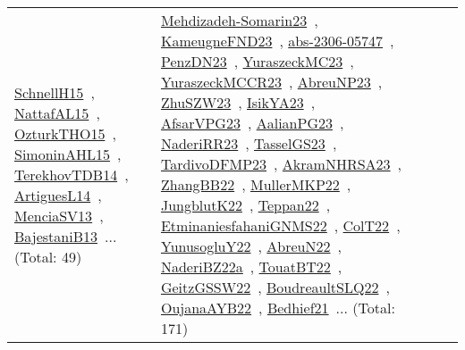 {\begin{longtable}{lp{3cm}>{\raggedright\arraybackslash}p{6cm}>{\raggedright\arraybackslash}p{6cm}>{\raggedright\arraybackslash}p{8cm}}
\href{../works/SchnellH15.pdf}{SchnellH15}~\cite{SchnellH15}, \href{../works/NattafAL15.pdf}{NattafAL15}~\cite{NattafAL15}, \href{../works/OzturkTHO15.pdf}{OzturkTHO15}~\cite{OzturkTHO15}, \href{../works/SimoninAHL15.pdf}{SimoninAHL15}~\cite{SimoninAHL15}, \href{../works/TerekhovTDB14.pdf}{TerekhovTDB14}~\cite{TerekhovTDB14}, \href{../works/ArtiguesL14.pdf}{ArtiguesL14}~\cite{ArtiguesL14}, \href{../works/MenciaSV13.pdf}{MenciaSV13}~\cite{MenciaSV13}, \href{../works/BajestaniB13.pdf}{BajestaniB13}~\cite{BajestaniB13}... (Total: 49) & \href{../works/Mehdizadeh-Somarin23.pdf}{Mehdizadeh-Somarin23}~\cite{Mehdizadeh-Somarin23}, \href{../works/KameugneFND23.pdf}{KameugneFND23}~\cite{KameugneFND23}, \href{../works/abs-2306-05747.pdf}{abs-2306-05747}~\cite{abs-2306-05747}, \href{../works/PenzDN23.pdf}{PenzDN23}~\cite{PenzDN23}, \href{../works/YuraszeckMC23.pdf}{YuraszeckMC23}~\cite{YuraszeckMC23}, \href{../works/YuraszeckMCCR23.pdf}{YuraszeckMCCR23}~\cite{YuraszeckMCCR23}, \href{../works/AbreuNP23.pdf}{AbreuNP23}~\cite{AbreuNP23}, \href{../works/ZhuSZW23.pdf}{ZhuSZW23}~\cite{ZhuSZW23}, \href{../works/IsikYA23.pdf}{IsikYA23}~\cite{IsikYA23}, \href{../works/AfsarVPG23.pdf}{AfsarVPG23}~\cite{AfsarVPG23}, \href{../works/AalianPG23.pdf}{AalianPG23}~\cite{AalianPG23}, \href{../works/NaderiRR23.pdf}{NaderiRR23}~\cite{NaderiRR23}, \href{../works/TasselGS23.pdf}{TasselGS23}~\cite{TasselGS23}, \href{../works/TardivoDFMP23.pdf}{TardivoDFMP23}~\cite{TardivoDFMP23}, \href{../works/AkramNHRSA23.pdf}{AkramNHRSA23}~\cite{AkramNHRSA23}, \href{../works/ZhangBB22.pdf}{ZhangBB22}~\cite{ZhangBB22}, \href{../works/MullerMKP22.pdf}{MullerMKP22}~\cite{MullerMKP22}, \href{../works/JungblutK22.pdf}{JungblutK22}~\cite{JungblutK22}, \href{../works/Teppan22.pdf}{Teppan22}~\cite{Teppan22}, \href{../works/EtminaniesfahaniGNMS22.pdf}{EtminaniesfahaniGNMS22}~\cite{EtminaniesfahaniGNMS22}, \href{../works/ColT22.pdf}{ColT22}~\cite{ColT22}, \href{../works/YunusogluY22.pdf}{YunusogluY22}~\cite{YunusogluY22}, \href{../works/AbreuN22.pdf}{AbreuN22}~\cite{AbreuN22}, \href{../works/NaderiBZ22a.pdf}{NaderiBZ22a}~\cite{NaderiBZ22a}, \href{../works/TouatBT22.pdf}{TouatBT22}~\cite{TouatBT22}, \href{../works/GeitzGSSW22.pdf}{GeitzGSSW22}~\cite{GeitzGSSW22}, \href{../works/BoudreaultSLQ22.pdf}{BoudreaultSLQ22}~\cite{BoudreaultSLQ22}, \href{../works/OujanaAYB22.pdf}{OujanaAYB22}~\cite{OujanaAYB22}, \href{../works/Bedhief21.pdf}{Bedhief21}~\cite{Bedhief21}... (Total: 171)\\

\end{longtable}}
